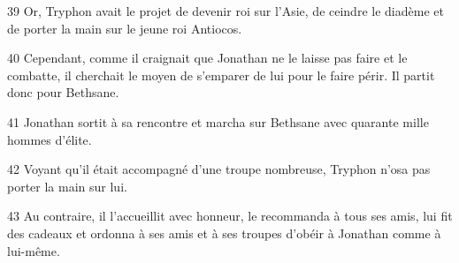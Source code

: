 39 Or, Tryphon avait le projet de devenir roi sur l’Asie, de ceindre le diadème et de porter la main sur le jeune roi Antiocos.

40 Cependant, comme il craignait que Jonathan ne le laisse pas faire et le combatte, il cherchait le moyen de s’emparer de lui pour le faire périr. Il partit donc pour Bethsane.

41 Jonathan sortit à sa rencontre et marcha sur Bethsane avec quarante mille hommes d’élite.

42 Voyant qu’il était accompagné d’une troupe nombreuse, Tryphon n’osa pas porter la main sur lui.

43 Au contraire, il l’accueillit avec honneur, le recommanda à tous ses amis, lui fit des cadeaux et ordonna à ses amis et à ses troupes d’obéir à Jonathan comme à lui-même.
